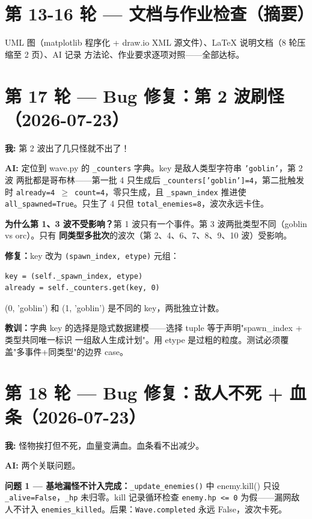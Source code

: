 \documentclass[12pt,a4paper]{ctexart}
\begin{document}
\section*{第 13-16 轮 — 文档与作业检查（摘要）}

UML 图（matplotlib 程序化 + draw.io XML 源文件）、LaTeX 说明文档（8 轮压缩至 2 页）、AI 记录
方法论、作业要求逐项对照——全部达标。

\section*{第 17 轮 — Bug 修复：第 2 波刷怪（2026-07-23）}

\textbf{我:} 第 2 波出了几只怪就不出了！

\textbf{AI:} 定位到 wave.py 的 \texttt{\_counters} 字典。key 是敌人类型字符串 \texttt{'goblin'}，第 2 波
两批都是哥布林——第一批 4 只生成后 \texttt{\_counters['goblin']=4}，第二批触发时 \texttt{already=4
$\geq$ count=4}，零只生成，且 \texttt{\_spawn\_index} 推进使 \texttt{all\_spawned=True}。只生了 4 只但
\texttt{total\_enemies=8}，波次永远卡住。

\textbf{为什么第 1、3 波不受影响？}第 1 波只有一个事件。第 3 波两批类型不同（goblin vs orc）。只有
\textbf{同类型多批次}的波次（第 2、4、6、7、8、9、10 波）受影响。

\textbf{修复：}key 改为 \texttt{(spawn\_index, etype)} 元组：
\begin{verbatim}
key = (self._spawn_index, etype)
already = self._counters.get(key, 0)
\end{verbatim}
(0, 'goblin') 和 (1, 'goblin') 是不同的 key，两批独立计数。

\textbf{教训：}字典 key 的选择是隐式数据建模——选择 tuple 等于声明"spawn\_index + 类型共同唯一标识
一组敌人生成计划"。用 etype 是过粗的粒度。测试必须覆盖"多事件+同类型"的边界 case。

\section*{第 18 轮 — Bug 修复：敌人不死 + 血条（2026-07-23）}

\textbf{我:} 怪物挨打但不死，血量变满血。血条看不出减少。

\textbf{AI:} 两个关联问题。

\textbf{问题 1 — 基地漏怪不计入完成：}\texttt{\_update\_enemies()} 中 enemy.kill() 只设
\texttt{\_alive=False}，\texttt{\_hp} 未归零。kill 记录循环检查 \texttt{enemy.hp <= 0} 为假——漏网敌
人不计入 \texttt{enemies\_killed}。后果：\texttt{Wave.completed} 永远 False，波次卡死。
\end{document}
